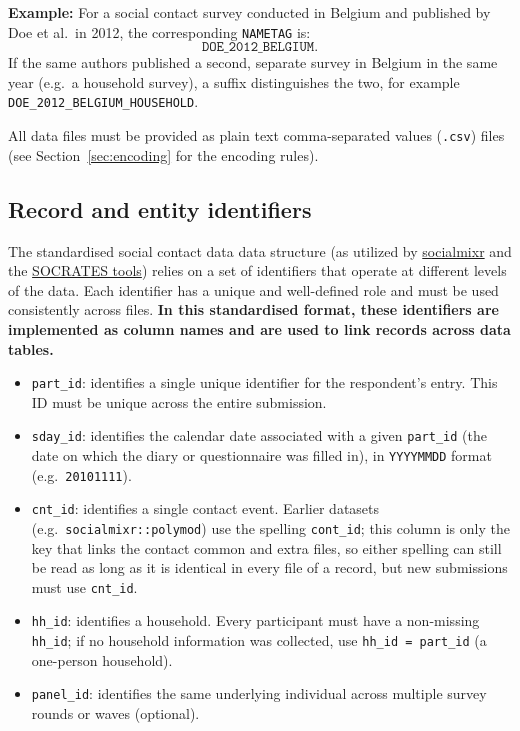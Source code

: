 \documentclass[11pt,a4paper]{article}
\begin{document}
\medskip
\noindent\textbf{Example:}
For a social contact survey conducted in Belgium and published by Doe et al.\ in 2012, the corresponding \texttt{NAMETAG} is:
\[
\texttt{DOE\_2012\_BELGIUM}.
\]
If the same authors published a second, separate survey in Belgium in the same year (e.g.\ a household survey), a suffix distinguishes the two, for example \texttt{DOE\_2012\_BELGIUM\_HOUSEHOLD}.

\medskip
\noindent
All data files must be provided as plain text comma-separated values (\texttt{.csv}) files (see Section~\ref{sec:encoding} for the encoding rules).

\subsection{Record and entity identifiers}
The standardised social contact data data structure (as utilized by \href{https://cran.r-project.org/web/packages/socialmixr/index.html}{socialmixr} and the \href{https://lwillem.shinyapps.io/socrates_rshiny/}{SOCRATES tools}) relies on a set of identifiers that operate at different levels of the data.
Each identifier has a unique and well-defined role and must be used consistently across files. \textbf{In this standardised format, these identifiers are implemented as column names and are used to link records across data tables.}

\begin{itemize}
    \item \texttt{part\_id}: identifies a single unique identifier for the respondent's entry. This ID must be unique across the entire submission.
    \item \texttt{sday\_id}: identifies the calendar date associated with a given \texttt{part\_id} (the date on which the diary or questionnaire was filled in), in \texttt{YYYYMMDD} format (e.g.\ \texttt{20101111}).
    \item \texttt{cnt\_id}: identifies a single contact event. Earlier datasets (e.g.\ \texttt{socialmixr::polymod}) use the spelling \texttt{cont\_id}; this column is only the key that links the contact common and extra files, so either spelling can still be read as long as it is identical in every file of a record, but new submissions must use \texttt{cnt\_id}.
    \item \texttt{hh\_id}: identifies a household. Every participant must have a non-missing \texttt{hh\_id}; if no household information was collected, use \texttt{hh\_id = part\_id} (a one-person household).
    \item \texttt{panel\_id}: identifies the same underlying individual across multiple survey rounds or waves (optional).
\end{itemize}
\end{document}
